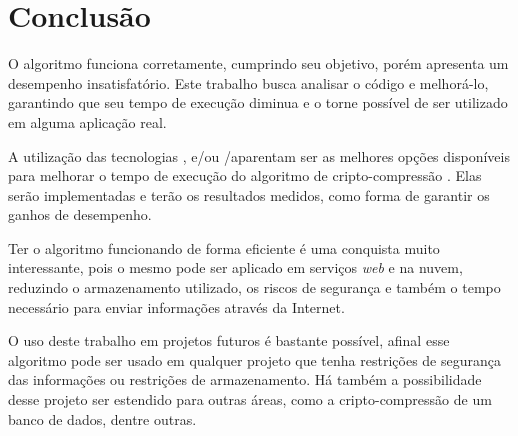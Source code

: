\chapter{Conclusão}
\label{cap7}

O algoritmo \gmpr funciona corretamente, cumprindo seu objetivo, porém apresenta um desempenho insatisfatório. Este trabalho busca analisar o código e melhorá-lo, garantindo que seu tempo de execução diminua e o torne possível de ser utilizado em alguma aplicação real.

A utilização das tecnologias \openMP, \mpi e/ou \cuda/\opencl aparentam ser as melhores opções disponíveis para melhorar o tempo de execução do algoritmo de cripto-compressão \gmpr. Elas serão implementadas e terão os resultados medidos, como forma de garantir os ganhos de desempenho.

Ter o algoritmo funcionando de forma eficiente é uma conquista muito interessante, pois o mesmo pode ser aplicado em serviços \textit{web} e na nuvem, reduzindo o armazenamento utilizado, os riscos de segurança e também o tempo necessário para enviar informações através da Internet.

O uso deste trabalho em projetos futuros é bastante possível, afinal esse algoritmo pode ser usado em qualquer projeto que tenha restrições de segurança das informações ou restrições de armazenamento. Há também a possibilidade desse projeto ser estendido para outras áreas, como a cripto-compressão de um banco de dados, dentre outras.